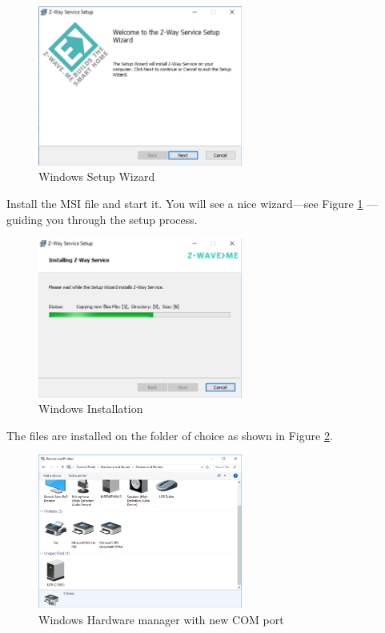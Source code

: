 \begin{figure}
\begin{center}
\includegraphics[width=0.6\textwidth]{pngs/cap3/winsetup1.png}
\caption{\zway Windows Setup Wizard}
\label{winsetup1}
\end{center}
\end{figure}

Install the MSI file and start it. You will see a nice wizard---see Figure \ref{winsetup1}
---guiding you through the setup process.


\begin{figure}
\begin{center}
\includegraphics[width=0.6\textwidth]{pngs/cap3/winsetup2.png}
\caption{\zway Windows Installation}
\label{winsetup2}
\end{center}
\end{figure}

The files are installed on the folder of choice as shown in Figure \ref{winsetup2}.


\begin{figure}
\begin{center}
\includegraphics[width=0.6\textwidth]{pngs/cap3/winsetup3.png}
\caption{Windows Hardware manager with new COM port}
\label{winsetup3}
\end{center}
\end{figure}

